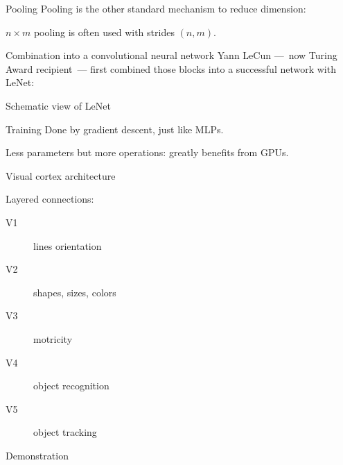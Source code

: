 \begin{frame}{Pooling}
  Pooling is the other standard mechanism to reduce dimension:


  $n \times m$ pooling is often used with strides $(n, m)$.
\end{frame}

\begin{frame}{Combination into a convolutional neural network}
  Yann LeCun ---~now Turing Award recipient~--- first combined those blocks into a successful network with LeNet:

\end{frame}

\begin{frame}{Schematic view of LeNet}
\end{frame}

\begin{frame}{Training}
  Done by gradient descent, just like MLPs.

  Less parameters but more operations: greatly benefits from GPUs.

\end{frame}

\begin{frame}{Visual cortex architecture}
  \begin{minipage}[l]{0.50\linewidth}
  \end{minipage}\hfill
  \begin{minipage}[l]{0.49\linewidth}
    Layered connections:
    \begin{description}
    \item[V1] lines orientation
    \item[V2] shapes, sizes, colors
    \item[V3] motricity
    \item[V4] object recognition
    \item[V5] object tracking
    \end{description}
  \end{minipage}\hfill
\end{frame}

\begin{frame}{Demonstration}
\end{frame}
